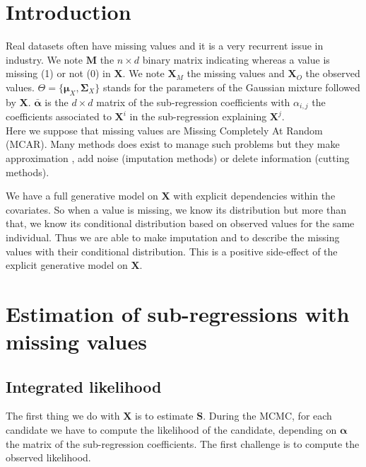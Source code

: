 \documentclass[12pt,a4paper]{report}
\begin{document}
	 \section{Introduction}
	Real datasets often have missing values and it is a very recurrent issue in industry. We note $\boldsymbol{M}$ the $n\times d$ binary matrix indicating whereas a value is missing (1) or not (0) in $\boldsymbol{X}$.
	We note $\boldsymbol{X}_M$ the missing values and $\boldsymbol{X}_{O}$ the observed values. $\Theta=\{\boldsymbol{\mu}_X,\boldsymbol{\Sigma}_X \}$ stands for the parameters of the Gaussian mixture followed by $\boldsymbol{X}$.
	$\bar{\boldsymbol{\alpha}}$ is the $d\times d$ matrix of the sub-regression coefficients with $\alpha_{i,j}$ the coefficients associated to $\boldsymbol{X}^i$ in the sub-regression explaining $\boldsymbol{X}^j$.\\ 
			Here we suppose that missing values are Missing Completely At Random (MCAR). 
	 Many methods does exist to manage such problems \cite{little1992regression} but they make approximation , add noise (imputation methods) or delete information (cutting methods).	
	 
%	 
%	 
	We have a full generative model on $\boldsymbol{X}$ with explicit dependencies within the covariates. So when a value is missing, we know its distribution but more than that, we know its conditional distribution based on observed values for the same individual. Thus we are able to make imputation and to describe the missing values with their conditional distribution. This is a positive side-effect of the explicit generative model on $\boldsymbol{X}$. 
\section{Estimation of sub-regressions with missing values}
\subsection{Integrated likelihood}
The first thing we do with $\boldsymbol{X}$ is to estimate $\boldsymbol{S}$.
	 During the MCMC, for each candidate we have to compute the likelihood of the candidate, depending on $\boldsymbol{\alpha}$ the matrix of the sub-regression coefficients. The first challenge is to compute the observed likelihood.\\
	 
\end{document}
